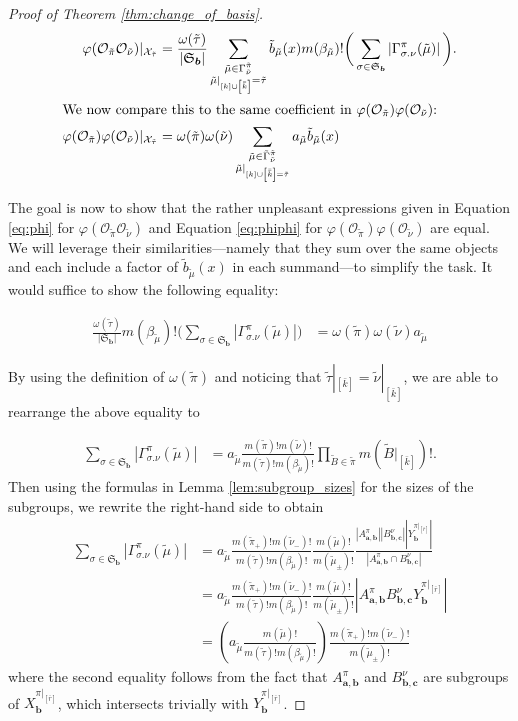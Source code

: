 \documentclass[ALCO,Unicode,published]{cedram}
\newcommand{\XX}{\mathcal{X}}
\newcommand{\OO}{\mathcal{O}}
\newcommand{\SG}{\mathfrak{S}}
\newcommand{\bfa}{{\boldsymbol{a}}}
\newcommand{\bfb}{{\boldsymbol{b}}}
\newcommand{\bfc}{{\boldsymbol{c}}}
\newcommand{\ttau}{{\tilde{\tau}}}
\newcommand{\tpi}{{\tilde{\pi}}}
\newcommand{\tmu}{{\tilde{\mu}}}
\newcommand{\tnu}{{\tilde{\nu}}}
\newcommand{\tB}{{\tilde{B}}}
\newcommand{\ov}[1]{\bar{#1}}
\newcommand{\ovb}[1]{\left[\ov{#1}\right]}
\newcommand{\ovov}[1]{\bar{\bar{#1}}}
\newcommand{\ovovb}[1]{\left[\ovov{#1}\right]}
\newcommand{\abs}[1]{\left| #1\right |}
\begin{document}
\begin{proof}[Proof of Theorem \ref{thm:change_of_basis}]
\begin{align}
        \varphi(\OO_\tpi\OO_\tnu)|_{\XX_\ttau}&=\frac{\omega(\ttau)}{\abs{\SG_\bfb}}\sum_{\substack{\tmu\in\Gamma^\tpi_\tnu\\\tmu|_{[k]\cup\ovovb{k}}=\ttau}}\tilde{b}_\tmu(x)m(\beta_\tmu)!\bigg(\sum_{\sigma\in\SG_\bfb}\abs{\Gamma^\pi_{\sigma.\nu}(\tmu)}\bigg).\label{eq:phi}\\
        \intertext{We now compare this to the same coefficient in $\varphi(\OO_\tpi)\varphi(\OO_\tnu)$:}
        \varphi(\OO_\tpi)\varphi(\OO_\tnu)|_{\XX_\ttau}&=\omega(\tpi)\omega(\tnu)\sum_{\substack{\tmu\in\tilde\Gamma^\tpi_\tnu\\\tmu|_{[k]\cup\ovovb{k}=\ttau}}}a_\tmu \tilde{b}_\tmu(x)\label{eq:phiphi}
    \end{align}

    The goal is now to show that the rather unpleasant expressions given in Equation \ref{eq:phi} for $\varphi(\OO_\tpi\OO_\tnu)$ and Equation \ref{eq:phiphi} for $\varphi(\OO_\tpi)\varphi(\OO_\tnu)$ are equal. We will leverage their similarities---namely that they sum over the same objects and each include a factor of $\tilde{b}_\tmu(x)$ in each summand---to simplify the task. It would suffice to show the following equality:

    \begin{align*}
        \frac{\omega(\ttau)}{\abs{\SG_\bfb}}m(\beta_\tmu)!\bigg(\sum_{\sigma\in\SG_\bfb}\abs{\Gamma^\pi_{\sigma.\nu}(\tmu)}\bigg)&=\omega(\tpi)\omega(\tnu)a_\tmu
    \end{align*}

    By using the definition of $\omega(\tpi)$ and noticing that $\ttau|_{\ovb{k}}=\tnu|_{\ovb{k}}$, we are able to rearrange the above equality to

    \begin{align*}
        \sum_{\sigma\in\SG_\bfb}\abs{\Gamma^\pi_{\sigma.\nu}(\tmu)}&=a_\tmu\frac{m(\tpi)!m(\tnu)!}{m(\ttau)!m(\beta_\tmu)!}\prod_{\tB\in\tpi}m(\tB|_{\ovb{k}})!.
    \end{align*}
    Then using the formulas in Lemma \ref{lem:subgroup_sizes} for the sizes of the subgroups, we rewrite the right-hand side to obtain
    \begin{align*}
        \sum_{\sigma\in\SG_\bfb}\abs{\Gamma^\pi_{\sigma.\nu}(\tmu)}&=a_\tmu\frac{m(\tpi_+)!m(\tnu_-)!}{m(\ttau)!m(\beta_\tmu)!}\frac{m(\tmu)!}{m(\tmu_\pm)!}\frac{\abs{A^\pi_{\bfa,\bfb}}\abs{B^\nu_{\bfb,\bfc}}\abs{Y_\bfb^{\pi|_{\ovb{r}}}}}{\abs{A_{\bfa,\bfb}^\pi\cap B_{\bfb,\bfc}^\nu}}\\
        &=a_\tmu\frac{m(\tpi_+)!m(\tnu_-)!}{m(\ttau)!m(\beta_\tmu)!}\frac{m(\tmu)!}{m(\tmu_\pm)!}\abs{A_{\bfa,\bfb}^\pi B_{\bfb,\bfc}^\nu Y_\bfb^{\pi|_{\ovb{r}}}}\\
        &=\left(a_\tmu\frac{m(\tmu)!}{m(\ttau)!m(\beta_\tmu)!}\right)\frac{m(\tpi_+)!m(\tnu_-)!}{m(\tmu_\pm)!}
    \end{align*} where the second equality follows from the fact that $A_{\bfa,\bfb}^\pi$ and $B_{\bfb,\bfc}^\nu$ are subgroups of $X_\bfb^{\pi|_{\ovb{r}}}$, which intersects trivially with $Y_\bfb^{\pi|_{\ovb{r}}}$.
    

\end{proof}
\end{document}

